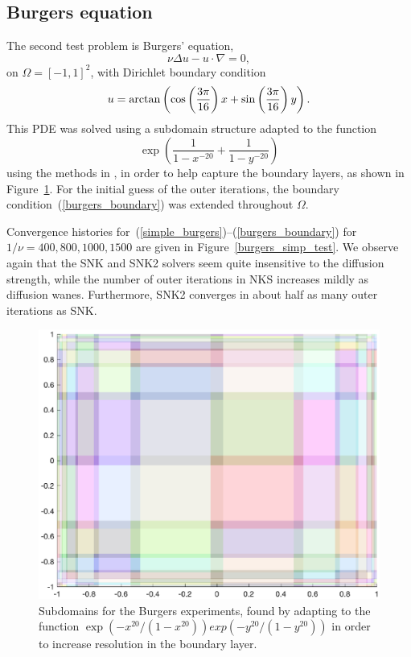 \subsection{Burgers equation}
\label{sec:burgers}

The second test problem is Burgers' equation,
\begin{equation}
  \nu \Delta u - u \cdot \nabla = 0,
  \label{simple_burgers}	
\end{equation}
on $\Omega = [-1,1]^2$, with Dirichlet boundary condition
\begin{equation}
  u = \arctan \left( \cos \left( \frac{3 \pi}{16} \right) x +\sin \left( \frac{3 \pi}{16} \right) y \right).
  \label{burgers_boundary}
\end{equation}
This PDE was solved using a subdomain structure adapted to the function 
\[
  \exp\left( \frac{1}{1-x^{-20}} + \frac{1}{1-y^{-20}} \right)
\]
using the methods in \cite{AitonTA}, in order to help capture the boundary layers, as shown in Figure~\ref{Burger_patch_structure}. For the initial guess of the outer iterations, the boundary condition~(\ref{burgers_boundary}) was extended throughout $\Omega$.

Convergence histories for~(\ref{simple_burgers})--(\ref{burgers_boundary}) for $1/\nu = 400,800,1000,1500$ are given in Figure~\ref{burgers_simp_test}. We observe again that the SNK and SNK2 solvers seem quite insensitive to the diffusion strength, while the number of outer iterations in NKS increases mildly as diffusion wanes. Furthermore, SNK2 converges in about half as many outer iterations as SNK. 

\begin{figure}
  \centering
  \includegraphics[scale = 0.6 ]{Chapter3/BurgersGrid}
  \caption{Subdomains for the Burgers experiments, found by adapting to the function  $\exp(-x^{20}/(1-x^{20}))exp(-y^{20}/(1-y^{20}))$ in order to increase resolution in the boundary layer.}
  \label{Burger_patch_structure}
\end{figure}

